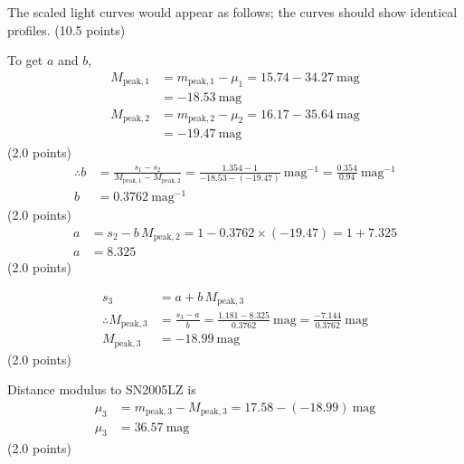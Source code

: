 \begin{description}
  The scaled light curves would appear as follows; the curves should show
  identical profiles. \hfill(10.5 points)

\item[(D3.4)] To get $a$ and $b$,
  \begin{align*}
    M_{\mathrm{peak},1} &= m_{\mathrm{peak},1} - \mu_1
      = 15.74 - 34.27\ \mathrm{mag} \\
      &= -18.53\ \mathrm{mag} \\
    M_{\mathrm{peak},2} &= m_{\mathrm{peak},2} - \mu_2
      = 16.17 - 35.64\ \mathrm{mag} \\
      &= -19.47\ \mathrm{mag}
  \end{align*}
  \hfill(2.0 points)
  \begin{align*}
    \therefore b &= \frac{s_1 - s_2}{M_{\mathrm{peak},1} - M_{\mathrm{peak},2}}
      = \frac{1.354 - 1}{-18.53 - (-19.47)}\ \mathrm{mag}^{-1}
      = \frac{0.354}{0.94}\ \mathrm{mag}^{-1} \\
    b &= 0.3762\ \mathrm{mag}^{-1}
  \end{align*}
  \hfill(2.0 points)
  \begin{align*}
    a &= s_2 - b\,M_{\mathrm{peak},2} = 1 - 0.3762\times(-19.47)
       = 1 + 7.325 \\
    a &= 8.325
  \end{align*}
  \hfill(2.0 points)

\item[(D3.5)] \mbox{}
  \begin{align*}
    s_3 &= a + b\,M_{\mathrm{peak},3} \\
    \therefore M_{\mathrm{peak},3} &= \frac{s_3 - a}{b}
      = \frac{1.181 - 8.325}{0.3762}\ \mathrm{mag}
      = \frac{-7.144}{0.3762}\ \mathrm{mag} \\
    M_{\mathrm{peak},3} &= -18.99\ \mathrm{mag}
  \end{align*}
  \hfill(2.0 points)

  Distance modulus to SN2005LZ is
  \begin{align*}
    \mu_3 &= m_{\mathrm{peak},3} - M_{\mathrm{peak},3}
      = 17.58 - (-18.99)\ \mathrm{mag} \\
    \mu_3 &= 36.57\ \mathrm{mag}
  \end{align*}
  \hfill(2.0 points)


\end{description}

